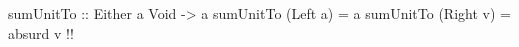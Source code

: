 \begin{code}
sumUnitTo :: Either a Void -> a
sumUnitTo (Left a)  = a
sumUnitTo (Right v) = absurd v  !!
\end{code}
